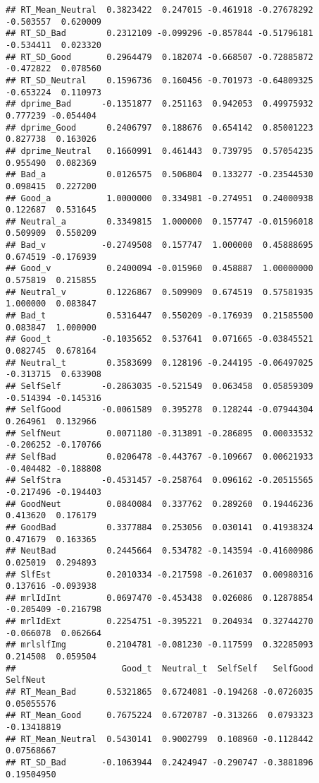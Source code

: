 \documentclass[man]{apa6}
\begin{document}
\begin{verbatim}
## RT_Mean_Neutral  0.3823422  0.247015 -0.461918 -0.27678292 -0.503557  0.620009
## RT_SD_Bad        0.2312109 -0.099296 -0.857844 -0.51796181 -0.534411  0.023320
## RT_SD_Good       0.2964479  0.182074 -0.668507 -0.72885872 -0.472822  0.078560
## RT_SD_Neutral    0.1596736  0.160456 -0.701973 -0.64809325 -0.653224  0.110973
## dprime_Bad      -0.1351877  0.251163  0.942053  0.49975932  0.777239 -0.054404
## dprime_Good      0.2406797  0.188676  0.654142  0.85001223  0.827738  0.163026
## dprime_Neutral   0.1660991  0.461443  0.739795  0.57054235  0.955490  0.082369
## Bad_a            0.0126575  0.506804  0.133277 -0.23544530  0.098415  0.227200
## Good_a           1.0000000  0.334981 -0.274951  0.24000938  0.122687  0.531645
## Neutral_a        0.3349815  1.000000  0.157747 -0.01596018  0.509909  0.550209
## Bad_v           -0.2749508  0.157747  1.000000  0.45888695  0.674519 -0.176939
## Good_v           0.2400094 -0.015960  0.458887  1.00000000  0.575819  0.215855
## Neutral_v        0.1226867  0.509909  0.674519  0.57581935  1.000000  0.083847
## Bad_t            0.5316447  0.550209 -0.176939  0.21585500  0.083847  1.000000
## Good_t          -0.1035652  0.537641  0.071665 -0.03845521  0.082745  0.678164
## Neutral_t        0.3583699  0.128196 -0.244195 -0.06497025 -0.313715  0.633908
## SelfSelf        -0.2863035 -0.521549  0.063458  0.05859309 -0.514394 -0.145316
## SelfGood        -0.0061589  0.395278  0.128244 -0.07944304  0.264961  0.132966
## SelfNeut         0.0071180 -0.313891 -0.286895  0.00033532 -0.206252 -0.170766
## SelfBad          0.0206478 -0.443767 -0.109667  0.00621933 -0.404482 -0.188808
## SelfStra        -0.4531457 -0.258764  0.096162 -0.20515565 -0.217496 -0.194403
## GoodNeut         0.0840084  0.337762  0.289260  0.19446236  0.413620  0.176179
## GoodBad          0.3377884  0.253056  0.030141  0.41938324  0.471679  0.163365
## NeutBad          0.2445664  0.534782 -0.143594 -0.41600986  0.025019  0.294893
## SlfEst           0.2010334 -0.217598 -0.261037  0.00980316  0.137616 -0.093938
## mrlIdInt         0.0697470 -0.453438  0.026086  0.12878854 -0.205409 -0.216798
## mrlIdExt         0.2254751 -0.395221  0.204934  0.32744270 -0.066078  0.062664
## mrlslfImg        0.2104781 -0.081230 -0.117599  0.32285093  0.214508  0.059504
##                     Good_t  Neutral_t  SelfSelf   SelfGood    SelfNeut
## RT_Mean_Bad      0.5321865  0.6724081 -0.194268 -0.0726035  0.05055576
## RT_Mean_Good     0.7675224  0.6720787 -0.313266  0.0793323 -0.13418819
## RT_Mean_Neutral  0.5430141  0.9002799  0.108960 -0.1128442  0.07568667
## RT_SD_Bad       -0.1063944  0.2424947 -0.290747 -0.3881896  0.19504950

\end{verbatim}
\end{document}
